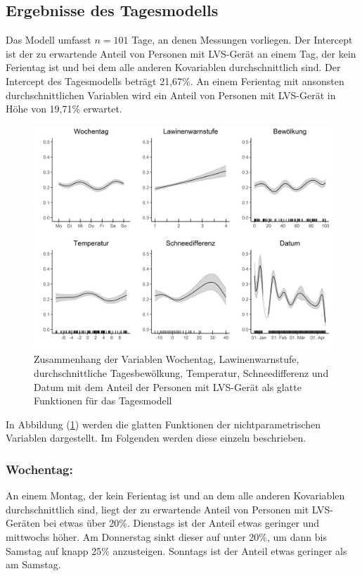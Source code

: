 \documentclass[12pt]{scrreprt}
\begin{document}
\subsection{Ergebnisse des Tagesmodells}
Das Modell umfasst $n = 101$ Tage, an denen Messungen vorliegen. 
Der Intercept ist der zu erwartende Anteil von Personen mit LVS-Gerät an einem Tag, der kein Ferientag ist und bei dem alle anderen Kovariablen durchschnittlich sind. Der Intercept des Tagesmodells beträgt 21,67\%. An einem Ferientag mit ansonsten durchschnittlichen Variablen wird ein Anteil von Personen mit LVS-Gerät in Höhe von 19,71\% erwartet. \\
\begin{figure}[H]
	\centering
	\includegraphics[width=\linewidth]{plots/smooth_day_model}
	\caption{Zusammenhang der Variablen Wochentag, Lawinenwarnstufe, durchschnittliche Tagesbewölkung, Temperatur, Schneedifferenz und Datum mit dem Anteil der Personen mit LVS-Gerät als glatte Funktionen für das Tagesmodell}
	\label{pic:smooth_day_model}	
\end{figure}
\noindent In Abbildung (\ref{pic:smooth_day_model}) werden die glatten Funktionen der nichtparametrischen Variablen dargestellt. Im Folgenden werden diese einzeln beschrieben.
\subsubsection*{Wochentag:}
An einem Montag, der kein Ferientag ist und an dem alle anderen Kovariablen durchschnittlich sind, liegt der zu erwartende Anteil von Personen mit LVS-Geräten bei etwas über 20\%. Dienstags ist der Anteil etwas geringer und mittwochs höher. Am Donnerstag sinkt dieser auf unter 20\%, um dann bis Samstag auf knapp 25\% anzusteigen. Sonntags ist der Anteil etwas geringer als am Samstag.
\end{document}
